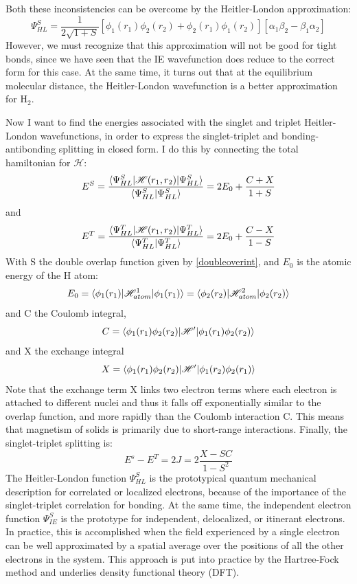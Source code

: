 Both these inconsistencies can be overcome by the Heitler-London approximation:
\begin{equation}
\Psi_{HL}^S = \frac{1}{2\sqrt{1+S}}[\phi_1(r_1)\phi_2(r_2)+\phi_2(r_1)\phi_1(r_2)][\alpha_1\beta_2-\beta_1\alpha_2]
\end{equation}
However, we must recognize that this approximation will not be good for tight bonds, since we have seen that the IE wavefunction does reduce to the correct form for this case. At the same time, it turns out that at the equilibrium molecular distance, the Heitler-London wavefunction is a better approximation for H$_2$.

Now I want to find the energies associated with the singlet and triplet Heitler-London wavefunctions, in order to express the singlet-triplet and bonding-antibonding splitting in closed form. I do this by connecting the total hamiltonian for $\mathscr{H}$:
\begin{equation}
E^S=\frac{\braket{\Psi_{HL}^S|\mathscr{H}(r_1,r_2)|\Psi_{HL}^S}}{\braket{\Psi_{HL}^S|\Psi_{HL}^S}}
= 2E_0+\frac{C+X}{1+S}
\end{equation}
and
\begin{equation}
E^T=\frac{\braket{\Psi_{HL}^T|\mathscr{H}(r_1,r_2)|\Psi_{HL}^T}}{\braket{\Psi_{HL}^T|\Psi_{HL}^T}}
= 2E_0+\frac{C-X}{1-S}
\label{HLenSin}
\end{equation}
With S the double overlap function given by \ref{doubleoverint}, and $E_0$ is the atomic energy of the H atom:
\begin{equation}
E_0=\braket{\phi_1(r_1)|\mathscr{H}^1_{atom}|\phi_1(r_1)}= \braket{\phi_2(r_2)|\mathscr{H}_{atom}^2|\phi_2(r_2)}
\label{HLenTrip}
\end{equation}
and C the Coulomb integral,
\begin{equation}
C=\braket{\phi_1(r_1)\phi_2(r_2)|\mathscr{H}'|\phi_1(r_1)\phi_2(r_2)}
\end{equation}
and X the exchange integral
\begin{equation}
X = \braket{\phi_1(r_1)\phi_2(r_2)|\mathscr{H}'|\phi_1(r_2)\phi_2(r_1)}
\end{equation}
Note that the exchange term X links two electron terms where each electron is attached to different nuclei and thus it falls off exponentially similar to the overlap function, and more rapidly than the Coulomb interaction C. This means that magnetism of solids is primarily due to short-range interactions. Finally, the singlet-triplet splitting is:
\begin{equation}
E^s-E^T=2J=2\frac{X-SC}{1-S^2}
\end{equation}
The Heitler-London function $\Psi_{HL}^S$ is the prototypical quantum mechanical description for correlated or localized electrons, because of the importance of the singlet-triplet correlation for bonding. At the same time, the independent electron function $\Psi_{IE}^S$ is the prototype for independent, delocalized, or itinerant electrons. In practice, this is accomplished when the field experienced by a single electron can be well approximated by a spatial average over the positions of all the other electrons in the system. This approach is put into practice by the Hartree-Fock method and underlies density functional theory (DFT).

